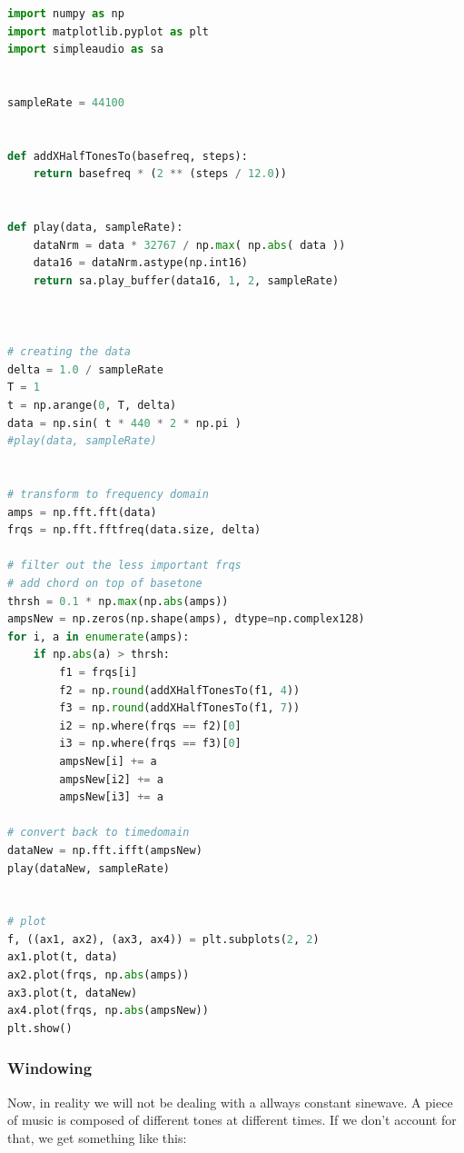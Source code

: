 \begin{lstlisting}[language=python]
import numpy as np
import matplotlib.pyplot as plt
import simpleaudio as sa


sampleRate = 44100


def addXHalfTonesTo(basefreq, steps):
    return basefreq * (2 ** (steps / 12.0))


def play(data, sampleRate):
    dataNrm = data * 32767 / np.max( np.abs( data ))
    data16 = dataNrm.astype(np.int16)
    return sa.play_buffer(data16, 1, 2, sampleRate)



# creating the data
delta = 1.0 / sampleRate
T = 1
t = np.arange(0, T, delta)
data = np.sin( t * 440 * 2 * np.pi )
#play(data, sampleRate)


# transform to frequency domain
amps = np.fft.fft(data)
frqs = np.fft.fftfreq(data.size, delta)

# filter out the less important frqs
# add chord on top of basetone
thrsh = 0.1 * np.max(np.abs(amps))
ampsNew = np.zeros(np.shape(amps), dtype=np.complex128)
for i, a in enumerate(amps):
    if np.abs(a) > thrsh:
        f1 = frqs[i]
        f2 = np.round(addXHalfTonesTo(f1, 4))
        f3 = np.round(addXHalfTonesTo(f1, 7))
        i2 = np.where(frqs == f2)[0]
        i3 = np.where(frqs == f3)[0]
        ampsNew[i] += a
        ampsNew[i2] += a
        ampsNew[i3] += a

# convert back to timedomain
dataNew = np.fft.ifft(ampsNew)
play(dataNew, sampleRate)


# plot
f, ((ax1, ax2), (ax3, ax4)) = plt.subplots(2, 2)
ax1.plot(t, data)
ax2.plot(frqs, np.abs(amps))
ax3.plot(t, dataNew)
ax4.plot(frqs, np.abs(ampsNew))
plt.show()
\end{lstlisting}


\subsubsection{Windowing}
Now, in reality we will not be dealing with a allways constant sinewave. A piece of music is composed of different tones at different times. If we don't account for that, we get something like this: 

